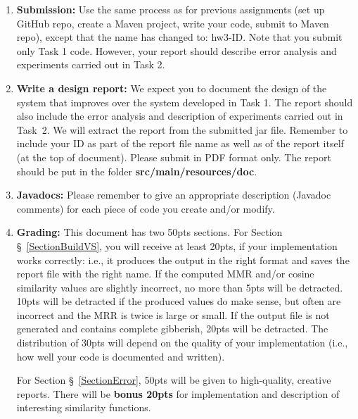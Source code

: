 \documentclass[oneside,11pt]{memoir}
\begin{document}
\begin{enumerate}

\item \textbf{Submission:} 
Use the same process as for previous assignments (set up GitHub repo, create a Maven 
project, write your code, submit to Maven repo), except that the name has changed to:
hw3-ID. Note that you submit only Task 1 code.
However, your report should describe error analysis and experiments 
carried out in Task 2.

\item \textbf{Write a design report:}
We expect you to document the design of the system that improves
over the system developed in Task 1.
The report should also include the error analysis and 
description of experiments carried out in Task~2.
We will extract the report from the submitted jar file. 
Remember to include your ID as part of the report file name 
as well as of the report itself (at the top of document).
Please submit in PDF format only.
The report should be put in the folder \textbf{src/main/resources/doc}.


\item \textbf{Javadocs:} 
Please remember to give an appropriate description (Javadoc comments) for each 
piece of code you create and/or modify.

\item \textbf{Grading:}
This document has two 50pts sections.
For Section \S~\ref{SectionBuildVS}, you will receive at least 20pts,
if your implementation works correctly: i.e., it produces
the output in the right format and saves
the report file with the right name.
If the computed MMR and/or cosine similarity values are slightly incorrect,
no more than 5pts will be detracted.
10pts will be detracted if the produced values do make sense, but often are incorrect
and the MRR is twice is large or small.
If the output file is not generated and contains complete gibberish, 20pts will be
detracted.
The distribution of 30pts will depend on the quality of your implementation
(i.e., how well your code is documented and written).

For Section \S~\ref{SectionError}, 50pts will be given
to high-quality, creative reports.
There will be \textbf{bonus 20pts} for implementation and description
of interesting similarity functions.


\end{enumerate}
\end{document}
